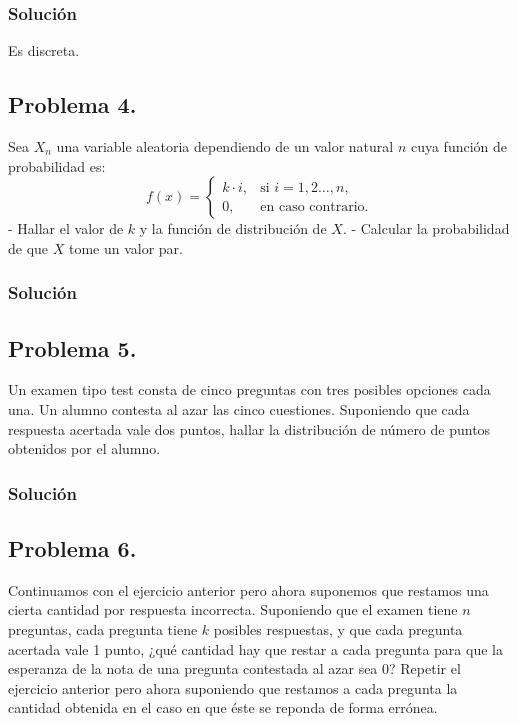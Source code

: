 \documentclass[
]{article}
\begin{document}
\hypertarget{soluciuxf3n-2}{%
\subsubsection{Solución}\label{soluciuxf3n-2}}

Es discreta.

\hypertarget{problema-4.}{%
\subsection{Problema 4.}\label{problema-4.}}

Sea \(X_n\) una variable aleatoria dependiendo de un valor natural \(n\)
cuya función de probabilidad es: \[
f(x)=\begin{cases}
k\cdot i, & \mbox{si }i=1,2\ldots,n, \\
0, & \mbox{en caso contrario.}
\end{cases}
\] - Hallar el valor de \(k\) y la función de distribución de \(X\). -
Calcular la probabilidad de que \(X\) tome un valor par.

\hypertarget{soluciuxf3n-3}{%
\subsubsection{Solución}\label{soluciuxf3n-3}}

\hypertarget{problema-5.}{%
\subsection{Problema 5.}\label{problema-5.}}

Un examen tipo test consta de cinco preguntas con tres posibles opciones
cada una. Un alumno contesta al azar las cinco cuestiones. Suponiendo
que cada respuesta acertada vale dos puntos, hallar la distribución de
número de puntos obtenidos por el alumno.

\hypertarget{soluciuxf3n-4}{%
\subsubsection{Solución}\label{soluciuxf3n-4}}

\hypertarget{problema-6.}{%
\subsection{Problema 6.}\label{problema-6.}}

Continuamos con el ejercicio anterior pero ahora suponemos que restamos
una cierta cantidad por respuesta incorrecta. Suponiendo que el examen
tiene \(n\) preguntas, cada pregunta tiene \(k\) posibles respuestas, y
que cada pregunta acertada vale 1 punto, ¿qué cantidad hay que restar a
cada pregunta para que la esperanza de la nota de una pregunta
contestada al azar sea 0? Repetir el ejercicio anterior pero ahora
suponiendo que restamos a cada pregunta la cantidad obtenida en el caso
en que éste se reponda de forma errónea.
\end{document}
